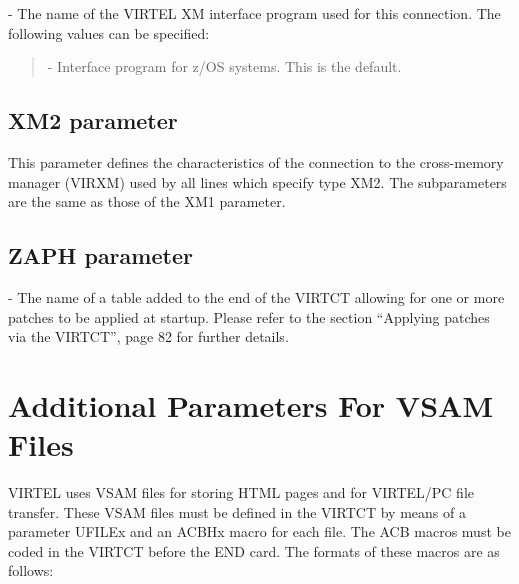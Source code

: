 \documentclass[letterpaper,10pt,english]{sphinxmanual}
\begin{document}
 - The name of the VIRTEL XM interface program used for this connection. The following values can be specified:
\begin{quote}

 - Interface program for z/OS systems. This is the default.
\end{quote}


\subsection{XM2 parameter}
\label{\detokenize{Installation_Guide:xm2-parameter}}
\begin{sphinxVerbatim}[commandchars=\\\{\}]
    
\PYG{p}{[}\PYG{p}{]}\PYG{p}{[}\PYG{p}{]}
\end{sphinxVerbatim}

This parameter defines the characteristics of the connection to the cross-memory manager (VIRXM) used by all lines which specify type XM2. The subparameters are the same as those of the XM1 parameter.


\subsection{ZAPH parameter}
\label{\detokenize{Installation_Guide:zaph-parameter}}\label{\detokenize{Installation_Guide:index-141}}
\begin{sphinxVerbatim}[commandchars=\\\{\}]
 
\end{sphinxVerbatim}

 - The name of a table added to the end of the VIRTCT allowing for one or more patches to be applied at startup. Please refer to the section “Applying patches via the VIRTCT”, page 82 for further details.

\newpage


\section{Additional Parameters For VSAM Files}
\label{\detokenize{Installation_Guide:additional-parameters-for-vsam-files}}\label{\detokenize{Installation_Guide:index-142}}
VIRTEL uses VSAM files for storing HTML pages and for VIRTEL/PC file transfer. These VSAM files must be defined in the VIRTCT by means of a parameter UFILEx and an ACBHx macro for each file. The ACB macros must be coded in the VIRTCT before the END card. The formats of these macros are as follows:
\end{document}
